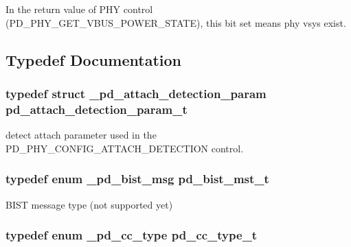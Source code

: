 In the return value of P\-H\-Y control (P\-D\-\_\-\-P\-H\-Y\-\_\-\-G\-E\-T\-\_\-\-V\-B\-U\-S\-\_\-\-P\-O\-W\-E\-R\-\_\-\-S\-T\-A\-T\-E), this bit set means phy vsys exist. 



\subsection{Typedef Documentation}
\hypertarget{group__usb__pd__phy__drv_gac52134faac462ac43b1a6fb59c6f693d}{
\subsubsection[{pd\-\_\-attach\-\_\-detection\-\_\-param\-\_\-t}]{\setlength{\rightskip}{0pt plus 5cm}typedef struct {\bf \-\_\-pd\-\_\-attach\-\_\-detection\-\_\-param}  {\bf pd\-\_\-attach\-\_\-detection\-\_\-param\-\_\-t}}}\label{group__usb__pd__phy__drv_gac52134faac462ac43b1a6fb59c6f693d}


detect attach parameter used in the P\-D\-\_\-\-P\-H\-Y\-\_\-\-C\-O\-N\-F\-I\-G\-\_\-\-A\-T\-T\-A\-C\-H\-\_\-\-D\-E\-T\-E\-C\-T\-I\-O\-N control. 

\hypertarget{group__usb__pd__phy__drv_ga311e952eb852cd3570504fe0699d10ec}{
\subsubsection[{pd\-\_\-bist\-\_\-mst\-\_\-t}]{\setlength{\rightskip}{0pt plus 5cm}typedef enum {\bf \-\_\-pd\-\_\-bist\-\_\-msg}  {\bf pd\-\_\-bist\-\_\-mst\-\_\-t}}}\label{group__usb__pd__phy__drv_ga311e952eb852cd3570504fe0699d10ec}


B\-I\-S\-T message type (not supported yet) 

\hypertarget{group__usb__pd__phy__drv_ga904cdd5d0d1e7026282617a10fe8a4c9}{
\subsubsection[{pd\-\_\-cc\-\_\-type\-\_\-t}]{\setlength{\rightskip}{0pt plus 5cm}typedef enum {\bf \-\_\-pd\-\_\-cc\-\_\-type}  {\bf pd\-\_\-cc\-\_\-type\-\_\-t}}}\label{group__usb__pd__phy__drv_ga904cdd5d0d1e7026282617a10fe8a4c9}


